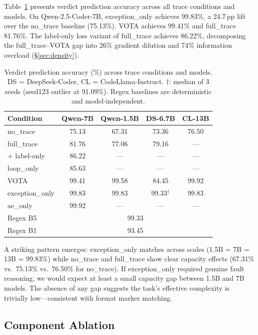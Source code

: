\documentclass[11pt,a4paper]{article}
\newcommand{\pp}{\,\text{pp}}
\begin{document}
Table~\ref{tab:main} presents verdict prediction accuracy across all trace conditions and models.
On Qwen-2.5-Coder-7B, exception\_only achieves 99.83\%, a 24.7$\pp$ lift over the no\_trace baseline (75.13\%).
VOTA achieves 99.41\% and full\_trace 81.76\%.
The label-only loss variant of full\_trace achieves 86.22\%, decomposing the full\_trace--VOTA gap into 26\% gradient dilution and 74\% information overload (\S\ref{sec:density}).

\begin{table}[t]
\centering
\small
\begin{tabular}{lcccc}
\toprule
\textbf{Condition} & \textbf{Qwen-7B} & \textbf{Qwen-1.5B} & \textbf{DS-6.7B} & \textbf{CL-13B} \\
\midrule
no\_trace          & 75.13 & 67.31 & 73.36 & 76.50 \\
full\_trace        & 81.76 & 77.06 & 79.16 & --- \\
\quad + label-only & 86.22 & --- & --- & --- \\
loop\_only         & 85.63 & --- & --- & --- \\
VOTA               & 99.41 & 99.58 & 84.45 & 99.92 \\
exception\_only    & 99.83 & 99.83 & 99.33$^\dagger$ & 99.83 \\
ae\_only           & 99.92 & --- & --- & --- \\
\midrule
Regex B5           & \multicolumn{4}{c}{99.33} \\
Regex B1           & \multicolumn{4}{c}{93.45} \\
\bottomrule
\end{tabular}
\caption{Verdict prediction accuracy (\%) across trace conditions and models. DS = DeepSeek-Coder, CL = CodeLlama-Instruct. $\dagger$: median of 3 seeds (seed123 outlier at 91.09\%). Regex baselines are deterministic and model-independent.}
\label{tab:main}
\end{table}

A striking pattern emerges: exception\_only matches across scales (1.5B = 7B = 13B = 99.83\%) while no\_trace and full\_trace show clear capacity effects (67.31\% vs.\ 75.13\% vs.\ 76.50\% for no\_trace).
If exception\_only required genuine fault reasoning, we would expect at least a small capacity gap between 1.5B and 7B models.
The absence of any gap suggests the task's effective complexity is trivially low---consistent with format marker matching.

\subsection{Component Ablation}
\label{sec:ablation}
\end{document}

